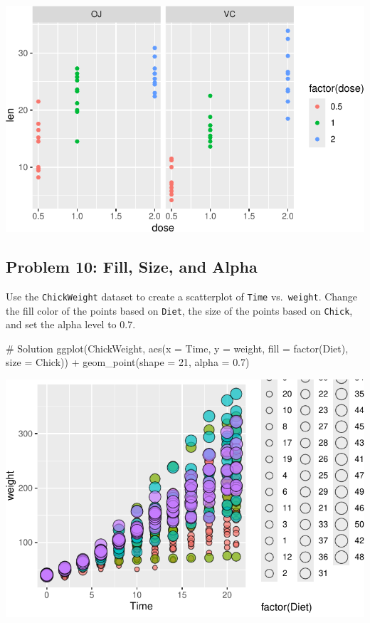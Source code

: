 \documentclass[
  letterpaper,
  DIV=11,
  numbers=noendperiod]{scrreprt}
\newenvironment{Shaded}{\begin{snugshade}}{\end{snugshade}}
\newcommand{\AttributeTok}[1]{\textcolor[rgb]{0.40,0.45,0.13}{#1}}
\newcommand{\CommentTok}[1]{\textcolor[rgb]{0.37,0.37,0.37}{#1}}
\newcommand{\DecValTok}[1]{\textcolor[rgb]{0.68,0.00,0.00}{#1}}
\newcommand{\FloatTok}[1]{\textcolor[rgb]{0.68,0.00,0.00}{#1}}
\newcommand{\FunctionTok}[1]{\textcolor[rgb]{0.28,0.35,0.67}{#1}}
\newcommand{\NormalTok}[1]{\textcolor[rgb]{0.00,0.23,0.31}{#1}}
\newcommand{\SpecialCharTok}[1]{\textcolor[rgb]{0.37,0.37,0.37}{#1}}
\begin{document}
\includegraphics{Advanced_Scatterplot_Techniques_files/figure-pdf/unnamed-chunk-28-1.pdf}

\subsection*{Problem 10: Fill, Size, and
Alpha}\label{problem-10-fill-size-and-alpha}

Use the \texttt{ChickWeight} dataset to create a scatterplot of
\texttt{Time} vs.~\texttt{weight}. Change the fill color of the points
based on \texttt{Diet}, the size of the points based on \texttt{Chick},
and set the alpha level to 0.7.

\begin{Shaded}
\begin{Highlighting}[]
\CommentTok{\# Solution}
\FunctionTok{ggplot}\NormalTok{(ChickWeight, }\FunctionTok{aes}\NormalTok{(}\AttributeTok{x =}\NormalTok{ Time, }\AttributeTok{y =}\NormalTok{ weight, }\AttributeTok{fill =} \FunctionTok{factor}\NormalTok{(Diet), }\AttributeTok{size =}\NormalTok{ Chick)) }\SpecialCharTok{+}
  \FunctionTok{geom\_point}\NormalTok{(}\AttributeTok{shape =} \DecValTok{21}\NormalTok{, }\AttributeTok{alpha =} \FloatTok{0.7}\NormalTok{)}
\end{Highlighting}
\end{Shaded}

\includegraphics{Advanced_Scatterplot_Techniques_files/figure-pdf/unnamed-chunk-29-1.pdf}
\end{document}

